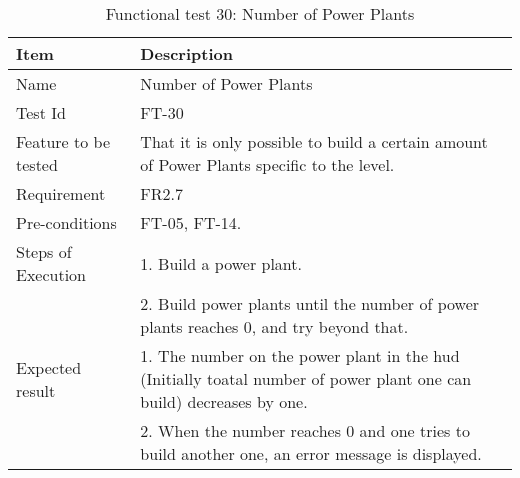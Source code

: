 \begin{table}[H]
\centering
	\begin{tabular}{ l | p{8cm} }
		\hline
		\rowcolor{lightgray}
		{\bf Item} & {\bf Description} \\ \hline
		Name & Number of Power Plants \\ 
		Test Id & FT-30 \\ 
		Feature to be tested & That it is only possible to build a certain amount of Power Plants specific to the level. \\ 
		Requirement & FR2.7 \\ 
		Pre-conditions & FT-05, FT-14. \\ 
		Steps of Execution & 1. Build a power plant. \\ 
		& 2. Build power plants until the number of power plants reaches 0, and try beyond that. \\
		Expected result & 1. The number on the power plant in the hud (Initially toatal number of power plant one can build) decreases by one. \\
		& 2. When the number reaches 0 and one tries to build another one, an error message is displayed. \\
		\hline
	\end{tabular}
	\caption{Functional test 30: Number of Power Plants}
\end{table}
